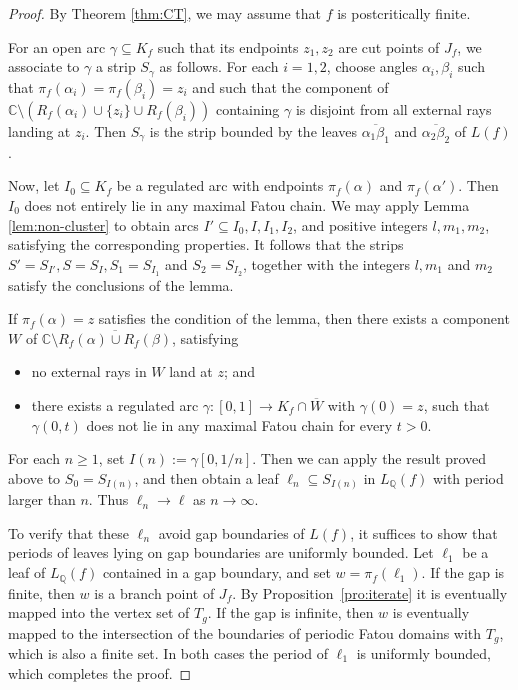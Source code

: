 \documentclass[a4paper,reqno,times, 11pt]{amsart}
\theoremstyle{remark}
\theoremstyle{plain}
\numberwithin{equation}{section}
\def\g{\gamma}
\def\C{\mbox{$\mathbb C$}}
\def\Q{\mathbb Q}
\begin{document}
	\begin{proof}
		By Theorem \ref{thm:CT}, we may assume that $f$ is postcritically finite.
		
		For an open arc $\gamma \subseteq K_f$ such that its endpoints  $z_1, z_2$ are cut points of $J_f$, we associate to $\gamma$ a strip $S_\gamma$ as follows. For each $i = 1, 2$, choose angles $\alpha_i,\beta_i$ such that $\pi_f(\alpha_i)=\pi_f(\beta_i) = z_i$ and such that the component of $\mathbb{C} \setminus (R_f(\alpha_i) \cup \{z_i\} \cup R_f(\beta_i))$ containing $\gamma$ is disjoint from all external rays landing at $z_i$. Then $S_\gamma$ is the strip bounded by the leaves $\overline{\alpha_1\beta_1}$ and $\overline{\alpha_2\beta_2}$ of $L(f)$.
		
		Now, let $I_0\subseteq K_f$ be a regulated arc with  endpoints  $\pi_f(\alpha)$ and $\pi_f(\alpha')$. Then $I_0$ does not entirely lie in any maximal Fatou chain.
		We may apply Lemma \ref{lem:non-cluster} to obtain arcs $I'\subseteq I_0, I, I_1,I_2$, and positive integers $l,m_1,m_2$, satisfying the corresponding properties. It follows that the strips $S'=S_{I'},S=S_{I}, S_1=S_{I_1}$ and $S_2=S_{I_2}$, together with the integers $l,m_1$ and $m_2$ satisfy the conclusions of the lemma.
		
If $\pi_f(\alpha)=z$ satisfies the condition of the lemma, then there exists a component $W$ of $\C\setminus \overline{R_f(\alpha)\cup R_f(\beta)}$, satisfying 
\begin{itemize}
\item no external rays in $W$ land at $z$; and
\item there exists  a  regulated arc $\g:[0,1]\to K_f\cap \overline{W}$ with $\g(0)=z$, such that  $\g(0,t)$ does not lie in any maximal Fatou chain for every $t>0$.
\end{itemize}
For each  $n\geq1$, set $I(n):=\g[0,1/n]$.   Then we can apply the result proved above to $S_0=S_{I(n)}$, and then obtain a leaf $\ell_n\subseteq S_{I(n)}$ in $L_\Q(f)$ with period larger than $n$. Thus $\ell_n\to \ell$ as $n\to\infty$.

To verify that these \(\ell_n\) avoid gap boundaries of \(L(f)\), it suffices to show that periods of leaves lying on gap boundaries are uniformly bounded. Let \(\ell_1\) be a leaf of \(L_\mathbb Q(f)\) contained in a gap boundary, and set \(w=\pi_f(\ell_1)\).  
If the gap is finite, then \(w\) is a branch point of \(J_f\). By Proposition~\ref{pro:iterate} it is eventually mapped into the vertex set of \(T_g\).  
If the gap is infinite, then \(w\) is eventually mapped to the intersection of the boundaries of periodic Fatou domains with \(T_g\), which is also a finite set.  
In both cases the period of \(\ell_1\) is uniformly bounded, which completes the proof.
		\end{proof}
\end{document}
